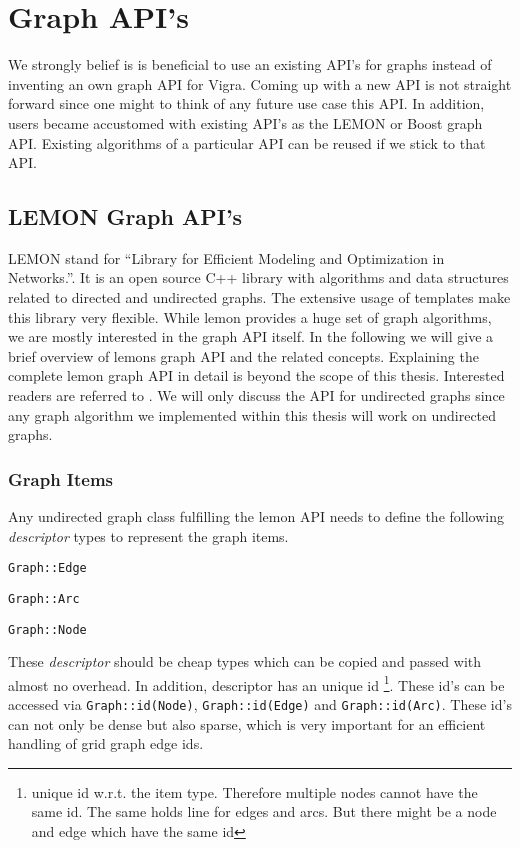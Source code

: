 
\section{Graph API's}\label{sec:graph_apis}

We strongly belief is is beneficial to use an existing API's for
graphs instead of inventing an own graph API for Vigra.
Coming up with a new API is not straight forward
since one might to think of any future use case this API.
In addition, users became accustomed with existing API's as 
the LEMON or Boost graph API.
Existing algorithms of a particular API can be reused if we stick
to that API.




\subsection{LEMON Graph API's}\label{sec:lemon_graph_apis}
    LEMON \citet{ software_lemon} 
    stand for  ``Library for Efficient Modeling and Optimization in Networks.''.
    It is an open source C++ library with algorithms and data structures 
    related to directed and undirected graphs.
    The extensive usage of templates make this library very flexible.
    While lemon provides a huge set of graph algorithms,
    we are mostly interested in the graph API itself.
    In the following we will give a brief overview of lemons graph 
    API and the related concepts.
    Explaining the complete lemon graph API in detail
    is beyond the scope of this thesis.
    Interested readers are referred to \citet{software_lemon}.
    We will only discuss the API for undirected graphs since any
    graph algorithm we implemented within this thesis
    will work on undirected graphs.

\subsubsection{Graph Items}
    Any undirected graph class fulfilling the lemon API needs to define 
    the following \emph{descriptor} types to represent the graph items.
    \begin{compactitem}
    \item \lstinline{Graph::Edge}
    \item \lstinline{Graph::Arc}
    \item \lstinline{Graph::Node}
    \end{compactitem}
    These \emph{descriptor} should be cheap types which can be copied
    and passed with almost no overhead.
    In addition, descriptor has an unique id
    \footnote{ unique id w.r.t. the item type. 
    Therefore  multiple  nodes cannot have the same id.
    The same holds line for edges and arcs.
    But there might be a node and edge which have the same id}.
    These id's can be accessed via \lstinline{Graph::id(Node)}, \lstinline{Graph::id(Edge)} and \lstinline{Graph::id(Arc)}.
    These id's can not only be dense but also sparse, which is very
    important for an efficient handling of grid graph edge ids.




